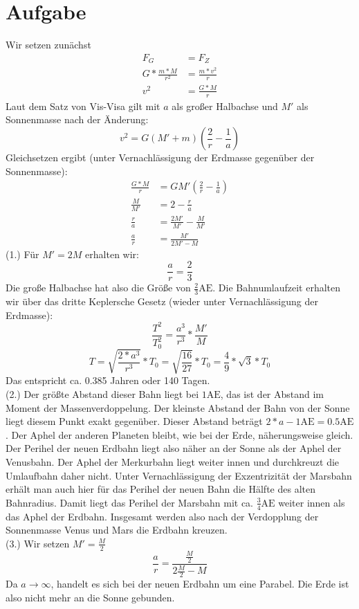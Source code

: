 \documentclass{article}
\begin{document}
	\section{Aufgabe}
	Wir setzen zunächst
	\begin{align*}
		F_G&=F_Z\\
		G*\frac{m*M}{r^2}&=\frac{m*v^2}{r}\\
		v^2&=\frac{G*M}{r}
	\end{align*}
	Laut dem Satz von Vis-Visa gilt mit $a$ als großer Halbachse und $M'$ als Sonnenmasse nach der Änderung:
	\[v^2=G(M'+m)\left(\frac{2}{r}-\frac{1}{a}\right)\]
	Gleichsetzen ergibt (unter Vernachlässigung der Erdmasse gegenüber der Sonnenmasse):
	\begin{align*}
		\frac{G*M}{r}&=GM'\left(\frac{2}{r}-\frac{1}{a}\right)\\
		\frac{M}{M'}&=2-\frac{r}{a}\\
		\frac{r}{a}&=\frac{2M'}{M'}-\frac{M}{M'}\\
		\frac{a}{r}&=\frac{M'}{2M'-M}
	\end{align*}
	(1.) Für $M'=2M$ erhalten wir: \[\frac{a}{r}=\frac{2}{3}\]
	Die große Halbachse hat also die Größe von $\frac{2}{3}\mathrm{AE}$.
	Die Bahnumlaufzeit erhalten wir über das dritte Keplersche Gesetz (wieder unter Vernachlässigung der Erdmasse):
	\[\frac{T^2}{T_0^2}=\frac{a^3}{r^3}*\frac{M'}{M}\]
	\[T=\sqrt{\frac{2*a^3}{r^3}}*T_0=\sqrt{\frac{16}{27}}*T_0=\frac{4}{9}*\sqrt{3}*T_0\]
	Das entspricht ca. 0.385 Jahren oder 140 Tagen.\\
	(2.) Der größte Abstand dieser Bahn liegt bei $1\mathrm{AE}$, das ist der Abstand im Moment der Massenverdoppelung. Der kleinste Abstand der Bahn von der Sonne liegt diesem Punkt exakt gegenüber. Dieser Abstand beträgt $2*a-1\mathrm{AE}=0.5\mathrm{AE}$. Der Aphel der anderen Planeten bleibt, wie bei der Erde, näherungsweise gleich. Der Perihel der neuen Erdbahn liegt also näher an der Sonne als der Aphel der Venusbahn. Der Aphel der Merkurbahn liegt weiter innen und durchkreuzt die Umlaufbahn daher nicht. Unter Vernachlässigung der Exzentrizität der Marsbahn erhält man auch hier für das Perihel der neuen Bahn die Hälfte des alten Bahnradius. Damit liegt das Perihel der Marsbahn mit ca. $\frac{3}{4}\mathrm{AE}$ weiter innen als das Aphel der Erdbahn. Insgesamt werden also nach der Verdopplung der Sonnenmasse Venus und Mars die Erdbahn kreuzen.\\
	(3.) Wir setzen $M'=\frac{M}{2}$
	\[\frac{a}{r}=\frac{\frac{M}{2}}{2\frac{M}{2}-M}\]
	Da $a\to\infty$, handelt es sich bei der neuen Erdbahn um eine Parabel. Die Erde ist also nicht mehr an die Sonne gebunden.
\end{document}
